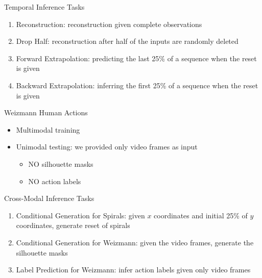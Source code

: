 \documentclass{beamer}
\begin{document}
\begin{frame}{Temporal Inference Tasks}
\begin{enumerate}
\item Reconstruction: reconstruction given complete observations
\item Drop Half: reconstruction after half of the inputs are randomly deleted
\item Forward Extrapolation: predicting the last 25\% of a sequence when the reset is given
\item Backward Extrapolation: inferring the first 25\% of a sequence when the reset is given
\end{enumerate}
\end{frame}

\begin{frame}{Weizmann Human Actions}
\begin{itemize}
\item Multimodal training
\item Unimodal testing: we provided only video frames as input
\begin{itemize}
\item NO silhouette masks
\item NO action labels
\end{itemize}
\end{itemize}
\end{frame}

\begin{frame}{Cross-Modal Inference Tasks}
\begin{enumerate}
\item Conditional Generation for Spirals: given $x$ coordinates and initial 25\% of $y$ coordinates, generate reset of spirals
\item Conditional Generation for Weizmann: given the video frames, generate the silhouette masks
\item Label Prediction for Weizmann: infer action labels given only video frames
\end{enumerate}
\end{frame}
\end{document}
